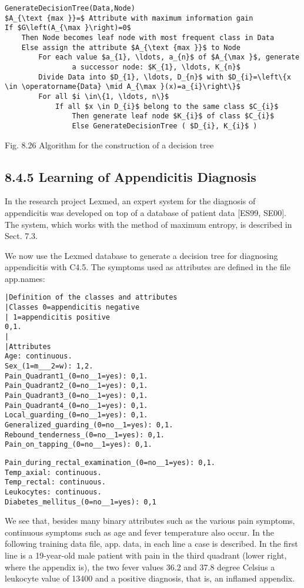 \documentclass[10pt]{article}
\begin{document}
\begin{verbatim}
GenerateDecisionTree(Data,Node)
$A_{\text {max }}=$ Attribute with maximum information gain
If $G\left(A_{\max }\right)=0$
    Then Node becomes leaf node with most frequent class in Data
    Else assign the attribute $A_{\text {max }}$ to Node
        For each value $a_{1}, \ldots, a_{n}$ of $A_{\max }$, generate
                a successor node: $K_{1}, \ldots, K_{n}$
        Divide Data into $D_{1}, \ldots, D_{n}$ with $D_{i}=\left\{x \in \operatorname{Data} \mid A_{\max }(x)=a_{i}\right\}$
        For all $i \in\{1, \ldots, n\}$
            If all $x \in D_{i}$ belong to the same class $C_{i}$
                Then generate leaf node $K_{i}$ of class $C_{i}$
                Else GenerateDecisionTree ( $D_{i}, K_{i}$ )
\end{verbatim}

Fig. 8.26 Algorithm for the construction of a decision tree

\subsection*{8.4.5 Learning of Appendicitis Diagnosis}
In the research project Lexmed, an expert system for the diagnosis of appendicitis was developed on top of a database of patient data [ES99, SE00]. The system, which works with the method of maximum entropy, is described in Sect. 7.3.

We now use the Lexmed database to generate a decision tree for diagnosing appendicitis with C4.5. The symptoms used as attributes are defined in the file app.names:

\begin{verbatim}
|Definition of the classes and attributes
|Classes 0=appendicitis negative
| 1=appendicitis positive
0,1.
|
|Attributes
Age: continuous.
Sex_(1=m___2=w): 1,2.
Pain_Quadrant1_(0=no__1=yes): 0,1.
Pain_Quadrant2_(0=no__1=yes): 0,1.
Pain_Quadrant3_(0=no__1=yes): 0,1.
Pain_Quadrant4_(0=no__1=yes): 0,1.
Local_guarding_(0=no__1=yes): 0,1.
Generalized_guarding_(0=no__1=yes): 0,1.
Rebound_tenderness_(0=no__1=yes): 0,1.
Pain_on_tapping_(0=no__1=yes): 0,1.
\end{verbatim}

\begin{verbatim}
Pain_during_rectal_examination_(0=no__1=yes): 0,1.
Temp_axial: continuous.
Temp_rectal: continuous.
Leukocytes: continuous.
Diabetes_mellitus_(0=no__1=yes): 0,1
\end{verbatim}

We see that, besides many binary attributes such as the various pain symptoms, continuous symptoms such as age and fever temperature also occur. In the following training data file, app. data, in each line a case is described. In the first line is a 19-year-old male patient with pain in the third quadrant (lower right, where the appendix is), the two fever values 36.2 and 37.8 degree Celsius a leukocyte value of 13400 and a positive diagnosis, that is, an inflamed appendix.
\end{document}
